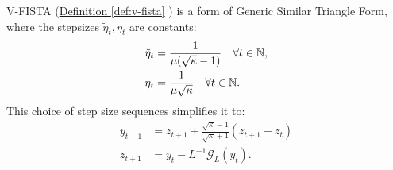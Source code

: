 \documentclass[12pt]{article}
\begin{document}
        \begin{proposition}
            V-FISTA 
            (\hyperref[def:v-fista]{Definition \ref*{def:v-fista}}
            ) is a form of Generic Similar Triangle Form, where the stepsizes $\tilde \eta_t, \eta_t$ are constants: 
            \begin{align*}
                \tilde \eta_t 
                &= \frac{1}{\mu(\sqrt{\kappa} - 1)}
                \quad \forall t \in \mathbb N, 
                \\
                \eta_t
                &= 
                \frac{1}{\mu\sqrt{\kappa}}
                \quad \forall t \in \mathbb N. 
            \end{align*}
            This choice of step size sequences simplifies it to:
            \begin{align*}
                y_{t + 1} &= z_{t + 1} + 
                \frac{\sqrt{\kappa} - 1}{\sqrt{\kappa} + 1}
                (z_{t +1} - z_t)
                \\
                z_{t + 1} 
                &= y_t - L^{-1}\mathcal G_L(y_t). 
            \end{align*}
        \end{proposition}
\end{document}
